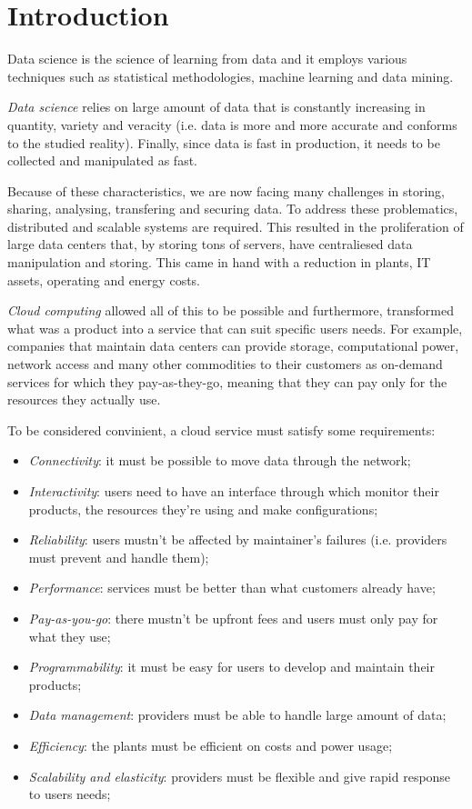 \chapter{Introduction}
\begin{definition}
    Data science is the science of learning from data and it employs various
    techniques such as statistical methodologies, machine learning and data
    mining.
\end{definition}

\noindent
\emph{Data science} relies on large amount of data that is constantly increasing
in quantity, variety and veracity (i.e. data is more and more accurate and
conforms to the studied reality). Finally, since data is fast in production, it
needs to be collected and manipulated as fast.

Because of these characteristics, we are now facing many challenges in storing,
sharing, analysing, transfering and securing data. To address these problematics,
distributed and scalable systems are required. This resulted in the proliferation
of large data centers that, by storing tons of servers, have centraliesed data
manipulation and storing. This came in hand with a reduction in plants, IT
assets, operating and energy costs.

\emph{Cloud computing} allowed all of this to be possible and furthermore,
transformed what was a product into a service that can suit specific users
needs. For example, companies that maintain data centers can provide storage,
computational power, network access and many other commodities to their
customers as on-demand services for which they pay-as-they-go, meaning that
they can pay only for the resources they actually use.

To be considered convinient, a cloud service must satisfy some requirements:
\begin{itemize}
    \item\emph{Connectivity}: it must be possible to move data through the
    network;
    \item\emph{Interactivity}: users need to have an interface through which
    monitor their products, the resources they're using and make configurations;
    \item\emph{Reliability}: users mustn't be affected by maintainer's failures
    (i.e. providers must prevent and handle them);
    \item\emph{Performance}: services must be better than what customers already
    have;
    \item\emph{Pay-as-you-go}: there mustn't be upfront fees and users must only
    pay for what they use;
    \item\emph{Programmability}: it must be easy for users to develop and maintain
    their products;
    \item\emph{Data management}: providers must be able to handle large amount
    of data;
    \item\emph{Efficiency}: the plants must be efficient on costs and power usage;
    \item\emph{Scalability and elasticity}: providers must be flexible and give
    rapid response to users needs;
\end{itemize}

